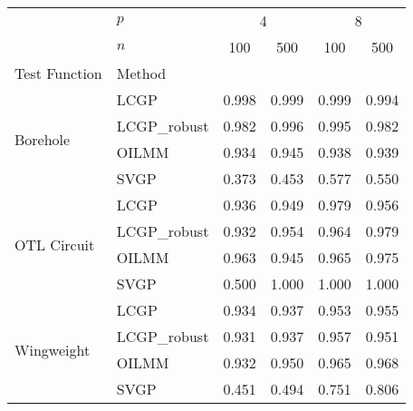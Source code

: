 \begin{tabular}{llcccc}
\hline
 &  $p$  & \multicolumn{2}{c}{4} & \multicolumn{2}{c}{8} \\
 & $n$ & 100 & 500 & 100 & 500 \\
Test Function &  Method  &  &  &  &  \\
\hline
\hline\multirow[c]{4}{*}{Borehole} & LCGP & 0.998 & 0.999 & 0.999 & 0.994 \\
 & LCGP\_robust & 0.982 & 0.996 & 0.995 & 0.982 \\
 & OILMM & 0.934 & 0.945 & 0.938 & 0.939 \\
 & SVGP & 0.373 & 0.453 & 0.577 & 0.550 \\
\hline\multirow[c]{4}{*}{OTL Circuit} & LCGP & 0.936 & 0.949 & 0.979 & 0.956 \\
 & LCGP\_robust & 0.932 & 0.954 & 0.964 & 0.979 \\
 & OILMM & 0.963 & 0.945 & 0.965 & 0.975 \\
 & SVGP & 0.500 & 1.000 & 1.000 & 1.000 \\
\hline\multirow[c]{4}{*}{Wingweight} & LCGP & 0.934 & 0.937 & 0.953 & 0.955 \\
 & LCGP\_robust & 0.931 & 0.937 & 0.957 & 0.951 \\
 & OILMM & 0.932 & 0.950 & 0.965 & 0.968 \\
 & SVGP & 0.451 & 0.494 & 0.751 & 0.806 \\
\hline
\end{tabular}

